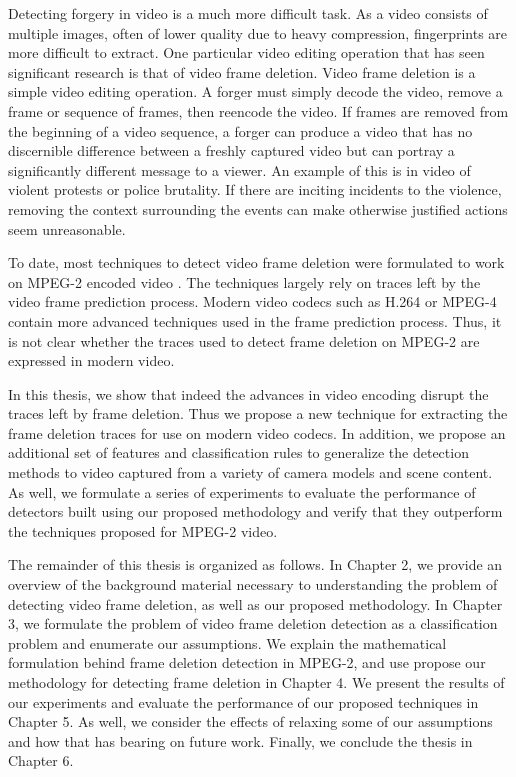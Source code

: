 Detecting forgery in video is a much more difficult task. As a video consists of multiple images, often of lower quality due to heavy compression, fingerprints are more difficult to extract. One particular video editing operation that has seen significant research is that of video frame deletion. Video frame deletion is a simple video editing operation. A forger must simply decode the video, remove a frame or sequence of frames, then reencode the video. If frames are removed from the beginning of a video sequence, a forger can produce a video that has no discernible difference between a freshly captured video but can portray a significantly different message to a viewer. An example of this is in video of violent protests or police brutality. If there are inciting incidents to the violence, removing the context surrounding the events can make otherwise justified actions seem unreasonable.

To date, most techniques to detect video frame deletion were formulated to work on MPEG-2 encoded video\cite{wang} \cite{stamm}. The techniques largely rely on traces left by the video frame prediction process. Modern video codecs such as H.264 or MPEG-4 contain more advanced techniques used in the frame prediction process. Thus, it is not clear whether the traces used to detect frame deletion on MPEG-2 are expressed in modern video. 

In this thesis, we show that indeed the advances in video encoding disrupt the traces left by frame deletion. Thus we propose a new technique for extracting the frame deletion traces for use on modern video codecs. In addition, we propose an additional set of features and classification rules to generalize the detection methods to video captured from a variety of camera models and scene content. As well, we formulate a series of experiments to evaluate the performance of detectors built using our proposed methodology and verify that they outperform the techniques proposed for MPEG-2 video.

The remainder of this thesis is organized as follows. In Chapter 2, we provide an overview of the background material necessary to understanding the problem of detecting video frame deletion, as well as our proposed methodology. In Chapter 3, we formulate the problem of video frame deletion detection as a classification problem and enumerate our assumptions. We explain the mathematical formulation behind frame deletion detection in MPEG-2, and use propose our methodology for detecting frame deletion in Chapter 4. We present the results of our experiments and evaluate the performance of our proposed techniques in Chapter 5. As well, we consider the effects of relaxing some of our assumptions and how that has bearing on future work. Finally, we conclude the thesis in Chapter 6.